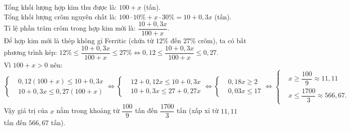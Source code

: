 \begin{bt}
{\begin{enumerate}[a)]
    Tổng khối lượng hợp kim thu được là: $100 + x$ (tấn).\\
    Tổng khối lượng crôm nguyên chất là:
    $100 \cdot 10\% + x \cdot 30\% = 10 + 0{,}3x$ (tấn).\\
    Tỉ lệ phần trăm crôm trong hợp kim mới là:
    $\dfrac{10 + 0{,}3x}{100 + x}$.\\
    Để hợp kim mới là thép không gỉ Ferritic (chứa từ $12\%$ đến $27\%$ crôm), ta có bất phương trình kép:
    $12\% \le \dfrac{10 + 0{,}3x}{100 + x} \le 27\% \Leftrightarrow 0{,}12 \le \dfrac{10 + 0{,}3x}{100 + x} \le 0{,}27$.\\
    Vì $100 + x > 0$ nên:
    $\left\{\begin{aligned} &0{,}12(100 + x) \le 10 + 0{,}3x \\ &10 + 0{,}3x \le 0{,}27(100 + x) \end{aligned}\right. \Leftrightarrow \left\{\begin{aligned} &12 + 0{,}12x \le 10 + 0{,}3x \\ &10 + 0{,}3x \le 27 + 0{,}27x \end{aligned}\right. \Leftrightarrow \left\{\begin{aligned} &0{,}18x \ge 2 \\ &0{,}03x \le 17 \end{aligned}\right. \Leftrightarrow \left\{\begin{aligned} &x \ge \dfrac{100}{9} \approx 11{,}11 \\ &x \le \dfrac{1700}{3} \approx 566{,}67. \end{aligned}\right.$\\
    Vậy giá trị của $x$ nằm trong khoảng từ $\dfrac{100}{9}$ tấn đến $\dfrac{1700}{3}$ tấn (xấp xỉ từ $11{,}11$ tấn đến $566{,}67$ tấn).
\end{enumerate}
}
\end{bt}

